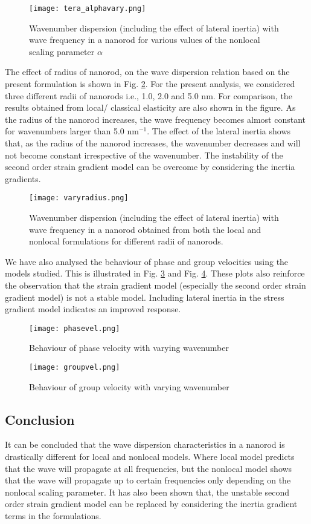 \begin{figure}
\centering
\texttt{[image: tera\_alphavary.png]}
\caption{Wavenumber dispersion (including the effect of lateral inertia) with wave
frequency in a nanorod for various values of the nonlocal scaling parameter $\alpha$}
\label{varyalpha}
\end{figure}

The effect of radius of nanorod, on the wave dispersion relation
based on the present formulation is shown in Fig. \ref{varyradius}. For the present
analysis, we considered three different radii of nanorods i.e., 1.0,
2.0 and 5.0 nm. For comparison, the results obtained from local/
classical elasticity are also shown in the figure. As the radius of the
nanorod increases, the wave frequency becomes almost constant for
wavenumbers larger than 5.0 $\text{nm}^{-1}$. The effect of the lateral inertia
shows that, as the radius of the nanorod increases, the wavenumber
decreases and will not become constant irrespective of the wavenumber. The instability of the second order strain gradient
model can be overcome by considering the inertia gradients.

\begin{figure}
\centering
\texttt{[image: varyradius.png]}
\caption{Wavenumber dispersion (including the effect of lateral inertia) with wave
frequency in a nanorod obtained from both the local and nonlocal formulations for
different radii of nanorods.}
\label{varyradius}
\end{figure}

We have also analysed the behaviour of phase and group velocities using the models studied. This is illustrated in Fig. \ref{phasevel} and Fig. \ref{groupvel}. These plots also reinforce the observation that the strain gradient model (especially the second order strain gradient model) is not a stable model. Including lateral inertia in the stress gradient model indicates an improved response.

\begin{figure}
\centering
\texttt{[image: phasevel.png]}
\caption{Behaviour of phase velocity with varying wavenumber}
\label{phasevel}
\end{figure}

\begin{figure}
\centering
\texttt{[image: groupvel.png]}
\caption{Behaviour of group velocity with varying wavenumber}
\label{groupvel}
\end{figure}

\subsection{Conclusion}
It can be concluded that the wave dispersion characteristics in a
nanorod is drastically different for local and nonlocal models.
Where local model predicts that the wave will propagate at all
frequencies, but the nonlocal model shows that the wave will
propagate up to certain frequencies only depending on the nonlocal
scaling parameter. It has also been shown that, the unstable second
order strain gradient model can be replaced by considering the
inertia gradient terms in the formulations. 
